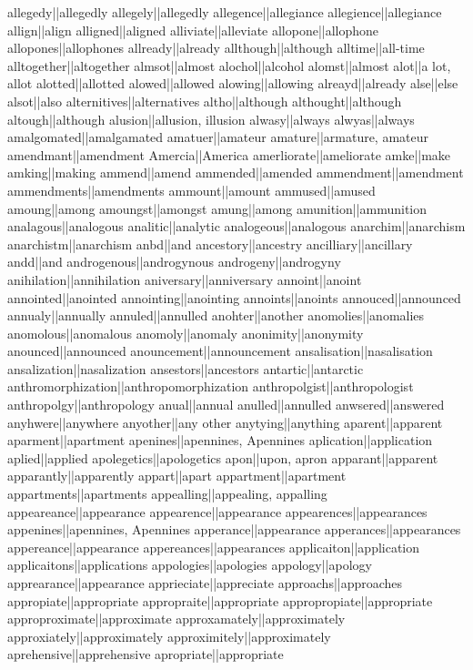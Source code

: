 allegedy||allegedly
allegely||allegedly
allegence||allegiance
allegience||allegiance
allign||align
alligned||aligned
alliviate||alleviate
allopone||allophone
allopones||allophones
allready||already
allthough||although
alltime||all-time
alltogether||altogether
almsot||almost
alochol||alcohol
alomst||almost
alot||a lot, allot
alotted||allotted
alowed||allowed
alowing||allowing
alreayd||already
alse||else
alsot||also
alternitives||alternatives
altho||although
althought||although
altough||although
alusion||allusion, illusion
alwasy||always
alwyas||always
amalgomated||amalgamated
amatuer||amateur
amature||armature, amateur
amendmant||amendment
Amercia||America
amerliorate||ameliorate
amke||make
amking||making
ammend||amend
ammended||amended
ammendment||amendment
ammendments||amendments
ammount||amount
ammused||amused
amoung||among
amoungst||amongst
amung||among
amunition||ammunition
analagous||analogous
analitic||analytic
analogeous||analogous
anarchim||anarchism
anarchistm||anarchism
anbd||and
ancestory||ancestry
ancilliary||ancillary
andd||and
androgenous||androgynous
androgeny||androgyny
anihilation||annihilation
aniversary||anniversary
annoint||anoint
annointed||anointed
annointing||anointing
annoints||anoints
annouced||announced
annualy||annually
annuled||annulled
anohter||another
anomolies||anomalies
anomolous||anomalous
anomoly||anomaly
anonimity||anonymity
anounced||announced
anouncement||announcement
ansalisation||nasalisation
ansalization||nasalization
ansestors||ancestors
antartic||antarctic
anthromorphization||anthropomorphization
anthropolgist||anthropologist
anthropolgy||anthropology
anual||annual
anulled||annulled
anwsered||answered
anyhwere||anywhere
anyother||any other
anytying||anything
aparent||apparent
aparment||apartment
apenines||apennines, Apennines
aplication||application
aplied||applied
apolegetics||apologetics
apon||upon, apron
apparant||apparent
apparantly||apparently
appart||apart
appartment||apartment
appartments||apartments
appealling||appealing, appalling
appeareance||appearance
appearence||appearance
appearences||appearances
appenines||apennines, Apennines
apperance||appearance
apperances||appearances
appereance||appearance
appereances||appearances
applicaiton||application
applicaitons||applications
appologies||apologies
appology||apology
apprearance||appearance
apprieciate||appreciate
approachs||approaches
appropiate||appropriate
appropraite||appropriate
appropropiate||appropriate
approproximate||approximate
approxamately||approximately
approxiately||approximately
approximitely||approximately
aprehensive||apprehensive
apropriate||appropriate
